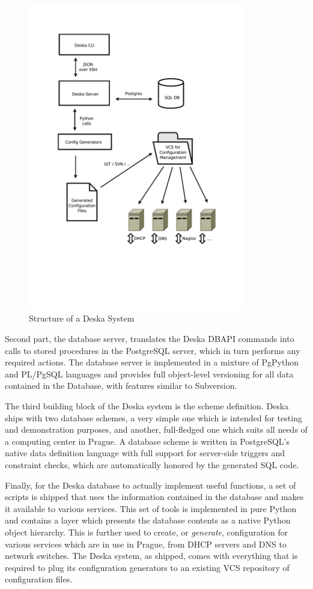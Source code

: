 \documentclass[deska]{subfiles}
\begin{document}
\begin{figure}[h]
    \centering
    \includegraphics[trim=28mm 64mm 28mm 27mm, clip=true, width=95mm]{img-deska-components.pdf}
    \caption{Structure of a Deska System}
\end{figure}

Second part, the database server, translates the Deska DBAPI commands into calls to stored procedures in the PostgreSQL
server, which in turn performs any required actions.  The database server is implemented in a mixture of PgPython and
PL/PgSQL languages and provides full object-level versioning for all data contained in the Database, with features
similar to Subversion.

The third building block of the Deska system is the scheme definition.  Deska ships with two database schemes, a very
simple one which is intended for testing and demonstration purposes, and another, full-fledged one which suits all needs
of a computing center in Prague.  A database scheme is written in PostgreSQL's native data definition language with full
support for server-side triggers and constraint checks, which are automatically honored by the generated SQL code.

Finally, for the Deska database to actually implement useful functions, a set of scripts is shipped that uses the
information contained in the database and makes it available to various services.  This set of tools is implemented in
pure Python and contains a layer which presents the database contents as a native Python object hierarchy.  This is
further used to create, or {\em generate}, configuration for various services which are in use in Prague, from DHCP
servers and DNS to network switches.  The Deska system, as shipped, comes with everything that is required to plug its
configuration generators to an existing VCS repository of configuration files.
\end{document}
